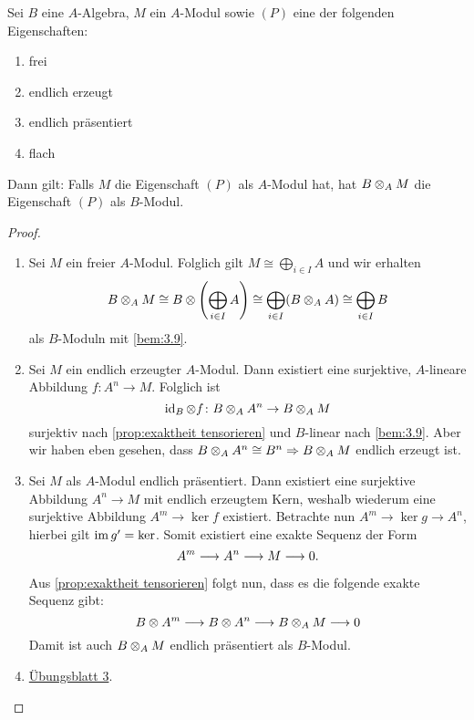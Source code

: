 \documentclass[12pt,a4paper]{scrartcl}
\theoremstyle{cplain}
\theoremstyle{cdef}
\begin{document}
\begin{satz}
	Sei $B$ eine $A$-Algebra, $M$ ein $A$-Modul sowie $(P)$ eine der folgenden Eigenschaften:
	\begin{enumerate}
		\item frei \label{thm:tensorieren erhaelt eigenschaften:i}
		\item endlich erzeugt \label{thm:tensorieren erhaelt eigenschaften:ii}
		\item endlich präsentiert \label{thm:tensorieren erhaelt eigenschaften:iii}
		\item flach \label{thm:tensorieren erhaelt eigenschaften:iv}
	\end{enumerate}	
	Dann gilt: Falls $M$ die Eigenschaft $(P)$ als $A$-Modul hat, hat $B\otimes_AM$ die Eigenschaft $(P)$ als $B$-Modul.
\end{satz}
\begin{proof}
	\leavevmode
	\begin{enumerate}[label=\ref{thm:tensorieren erhaelt eigenschaften:\roman*}]
		\item Sei $M$ ein freier $A$-Modul. Folglich gilt $M \cong \bigoplus_{i\in I}A$ und wir erhalten \[B\otimes_AM\cong B\otimes \left(\bigoplus_{i\in I}A\right) \cong \bigoplus_{i\in I}(B\otimes_A A) \cong \bigoplus_{i\in I} B\] als $B$-Moduln mit \cref{bem:3.9}.
		\item Sei $M$ ein endlich erzeugter $A$-Modul. Dann existiert eine surjektive, $A$-lineare Abbildung $f\colon A^n\to M$. Folglich ist
		$$\operatorname{id}_B\otimes f\colon B\otimes_AA^n\to B\otimes_AM$$ surjektiv nach \cref{prop:exaktheit tensorieren} und $B$-linear nach \cref{bem:3.9}. Aber wir haben eben gesehen, dass $B\otimes_AA^n \cong B^n\Rightarrow B\otimes_AM$ endlich erzeugt ist.
		\item Sei $M$ als $A$-Modul endlich präsentiert. Dann existiert eine surjektive Abbildung $A^n \to M$ mit endlich erzeugtem Kern, weshalb wiederum eine surjektive Abbildung $A^m \to \ker f$ existiert. Betrachte nun $A^m \to \ker g \to A^n$, hierbei gilt $\operatorname{im} g' = \operatorname{ker}$. Somit existiert eine exakte Sequenz der Form
		\[ A^m \longrightarrow A^n \longrightarrow M\longrightarrow 0. \]
		
		Aus \cref{prop:exaktheit tensorieren} folgt nun, dass es die folgende exakte Sequenz gibt:
		\[B\otimes A^m \longrightarrow B\otimes A^n \longrightarrow B\otimes_AM\longrightarrow 0\]
		Damit ist auch $B\otimes_AM$ endlich präsentiert als $B$-Modul.
		\item \href{http://www.math.uni-bonn.de/ag/stroppel/Franzen_Algebra_1_Uebung/Blatt3.pdf}{Übungsblatt 3}.
		\qedhere
	\end{enumerate}
\end{proof}
\end{document}
